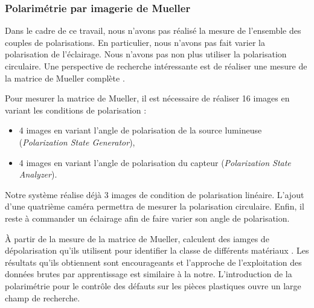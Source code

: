 
\subsubsection{Polarimétrie par imagerie de Mueller}
Dans le cadre de ce travail, nous n'avons pas réalisé la mesure de l'ensemble des couples de polarisations.
En particulier, nous n'avons pas fait varier la polarisation de l'éclairage.
Nous n'avons pas non plus utiliser la polarisation circulaire.
Une perspective de recherche intéressante est de réaliser une mesure de la matrice de Mueller complète \cite{pezzaniti_mueller_1995}.  %

Pour mesurer la matrice de Mueller, il est nécessaire de réaliser 16 images en variant les conditions de polarisation :
\begin{itemize}
	\item 4 images en variant l'angle de polarisation de la source lumineuse (\textit{Polarization State Generator}),
	\item 4 images en variant l'angle de polarisation du capteur (\textit{Polarization State Analyzer}).
\end{itemize}
Notre système réalise déjà 3 images de condition de polarisation linéaire.
L'ajout d'une quatrième caméra permettra de mesurer la polarisation circulaire.
Enfin, il reste à commander un éclairage afin de faire varier son angle de polarisation.

À partir de la mesure de la matrice de Mueller, \citeauthor{queau_learning_2019} calculent des iamges de dépolarisation qu'ils utilisent pour identifier la classe de différents matériaux \cite{queau_learning_2019}.
Les résultats qu'ils obtiennent sont encourageants et l'approche de l'exploitation des données brutes par apprentissage est similaire à la notre.
L'introduction de la polarimétrie pour le contrôle des défauts sur les pièces plastiques ouvre un large champ de recherche.

